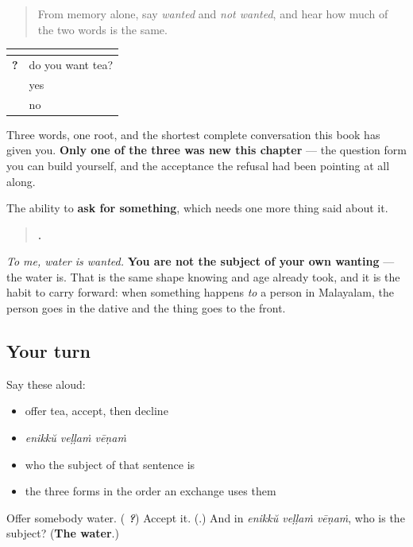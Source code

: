 \begin{quote}
From memory alone, say \emph{wanted} and \emph{not wanted}, and hear how much of the two words is the same.
\end{quote}

\begin{grammarlens}[title={Grammar Lens: one root, a whole exchange}]
\noindent
\begin{tabularx}{\linewidth}{@{}>{\raggedright\arraybackslash}X>{\raggedright\arraybackslash}X@{}}
\toprule
\textbf{} & \textbf{} \\
\midrule
\textbf{\ml{ചായ} \ml{വേണോ}?} & do you want tea? \\
\textbf{\ml{വേണം}} & yes \\
\textbf{\ml{വേണ്ട}} & no \\
\bottomrule
\end{tabularx}

Three words, one root, and the shortest complete conversation this book has given you. \textbf{Only one of the three was new this chapter} — the question form you can build yourself, and the acceptance the refusal had been pointing at all along.
\end{grammarlens}

\begin{grammarlens}[title={What you've built}]
The ability to \textbf{ask for something}, which needs one more thing said about it.

\begin{quote}
\textbf{  .}
\end{quote}

\emph{To me, water is wanted.} \textbf{You are not the subject of your own wanting} — the water is. That is the same shape knowing and age already took, and it is the habit to carry forward: when something happens \emph{to} a person in Malayalam, the person goes in the dative and the thing goes to the front.
\end{grammarlens}

\subsection*{Your turn}
Say these aloud:

\begin{itemize}
\raggedright
  \item offer tea, accept, then decline
  \item \emph{enikkŭ veḷḷaṁ vēṇaṁ}
  \item who the subject of that sentence is
  \item the three forms in the order an exchange uses them
\end{itemize}

\begin{tcolorbox}[breakable,colback=teal!4,colframe=teal!35!black,title={Before you move on}]
Offer somebody water. (\emph{\textbf{ ?}}) Accept it. (\emph{\textbf{}}.) And in \emph{enikkŭ veḷḷaṁ vēṇaṁ}, who is the subject? (\textbf{The water}.)
\end{tcolorbox}

